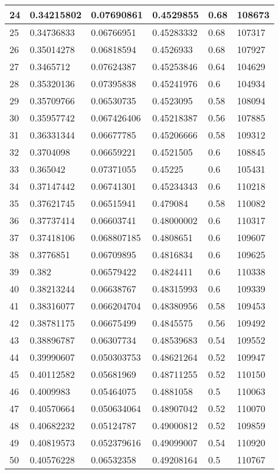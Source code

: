 \begin{longtable}{|l|l|l|l|l|l|}
24 & 0.34215802 & 0.07690861 & 0.4529855 & 0.68 & 108673 \\ \hline 
25 & 0.34736833 & 0.06766951 & 0.45283332 & 0.68 & 107317 \\ \hline 
26 & 0.35014278 & 0.06818594 & 0.4526933 & 0.68 & 107927 \\ \hline 
27 & 0.3465712 & 0.07624387 & 0.45253846 & 0.64 & 104629 \\ \hline 
28 & 0.35320136 & 0.07395838 & 0.45241976 & 0.6 & 104934 \\ \hline 
29 & 0.35709766 & 0.06530735 & 0.4523095 & 0.58 & 108094 \\ \hline 
30 & 0.35957742 & 0.067426406 & 0.45218387 & 0.56 & 107885 \\ \hline 
31 & 0.36331344 & 0.06677785 & 0.45206666 & 0.58 & 109312 \\ \hline 
32 & 0.3704098 & 0.06659221 & 0.4521505 & 0.6 & 108845 \\ \hline 
33 & 0.365042 & 0.07371055 & 0.45225 & 0.6 & 105431 \\ \hline 
34 & 0.37147442 & 0.06741301 & 0.45234343 & 0.6 & 110218 \\ \hline 
35 & 0.37621745 & 0.06515941 & 0.479084 & 0.58 & 110082 \\ \hline 
36 & 0.37737414 & 0.06603741 & 0.48000002 & 0.6 & 110317 \\ \hline 
37 & 0.37418106 & 0.068807185 & 0.4808651 & 0.6 & 109607 \\ \hline 
38 & 0.3776851 & 0.06709895 & 0.4816834 & 0.6 & 109625 \\ \hline 
39 & 0.382 & 0.06579422 & 0.4824411 & 0.6 & 110338 \\ \hline 
40 & 0.38213244 & 0.06638767 & 0.48315993 & 0.6 & 109339 \\ \hline 
41 & 0.38316077 & 0.066204704 & 0.48380956 & 0.58 & 109453 \\ \hline 
42 & 0.38781175 & 0.06675499 & 0.4845575 & 0.56 & 109492 \\ \hline 
43 & 0.38896787 & 0.06307734 & 0.48539683 & 0.54 & 109552 \\ \hline 
44 & 0.39990607 & 0.050303753 & 0.48621264 & 0.52 & 109947 \\ \hline 
45 & 0.40112582 & 0.05681969 & 0.48711255 & 0.52 & 110150 \\ \hline 
46 & 0.4009983 & 0.05464075 & 0.4881058 & 0.5 & 110063 \\ \hline 
47 & 0.40570664 & 0.050634064 & 0.48907042 & 0.52 & 110070 \\ \hline 
48 & 0.40682232 & 0.05124787 & 0.49000812 & 0.52 & 109859 \\ \hline 
49 & 0.40819573 & 0.052379616 & 0.49099007 & 0.54 & 110920 \\ \hline 
50 & 0.40576228 & 0.06532358 & 0.49208164 & 0.5 & 110767 \\ \hline 
\end{longtable}
